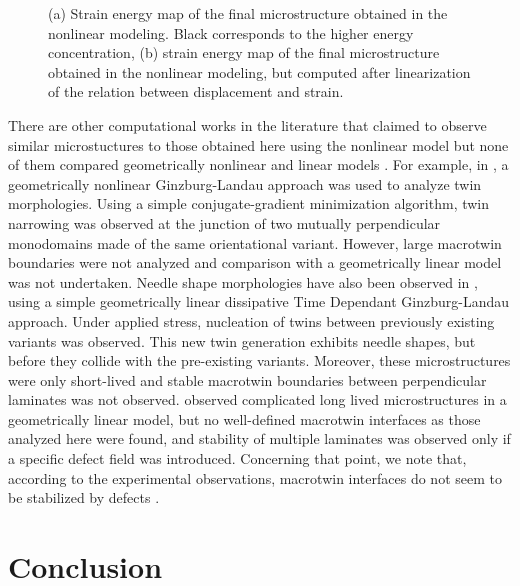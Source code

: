 \documentclass[twocolumn,amsmath,amssymb]{revtex4}
\begin{document}
%     
%
% 
\begin{figure}
\begin{center}
\hspace{10mm}
\caption{\label{strain_energy_maps}(a) Strain energy map of the final microstructure obtained in the nonlinear modeling. Black corresponds to the higher energy concentration, (b) strain energy map of the final microstructure obtained in the nonlinear modeling, but computed after linearization of the relation between displacement and strain.}\end{center}
\end{figure}
%
There are other computational works in the literature that claimed to observe similar microstuctures to those obtained here using the nonlinear model but none of them compared geometrically nonlinear and linear models \cite{KerEtAl99,Jac00,LevLee07}. For example, in \cite{Jac00}, a geometrically nonlinear Ginzburg-Landau approach was used to analyze twin morphologies. Using a simple conjugate-gradient minimization algorithm, twin narrowing was observed at the junction of two mutually perpendicular monodomains made of the same orientational variant. However,  large macrotwin boundaries were not analyzed and comparison with a geometrically linear model was not undertaken. Needle shape morphologies have also been observed in \cite{KerEtAl99}, using a simple geometrically linear dissipative Time Dependant Ginzburg-Landau approach. Under applied stress, nucleation of twins between previously existing variants was observed. This new twin generation exhibits needle shapes, but before they collide with the pre-existing variants. Moreover, these microstructures were only short-lived and stable macrotwin boundaries between perpendicular laminates was not observed. \cite{LevLee07} observed complicated long lived microstructures in a geometrically linear model, but no well-defined macrotwin interfaces as those analyzed here were found, and stability of multiple laminates was observed only if  a specific defect field was introduced. Concerning that point, we note that, according to the experimental observations, macrotwin interfaces do not seem to be stabilized by defects \cite{SchEtAl02}.
%
 \section{\label{sec:level2}Conclusion}
\end{document}
